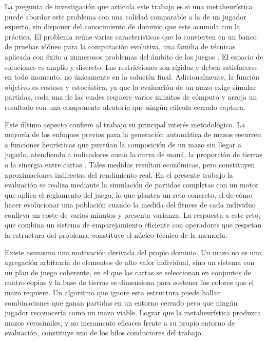La pregunta de investigación que articula este trabajo es si una metaheurística puede abordar este problema con una calidad comparable a la de un jugador experto, sin disponer del conocimiento de dominio que este acumula con la práctica. El problema reúne varias características que lo convierten en un banco de pruebas idóneo para la computación evolutiva, una familia de técnicas aplicada con éxito a numerosos problemas del ámbito de los juegos \cite{yannakakis2018, risi2017}. El espacio de soluciones es amplio y discreto. Las restricciones son rígidas y deben satisfacerse en todo momento, no únicamente en la solución final. Adicionalmente, la función objetivo es costosa y estocástica, ya que la evaluación de un mazo exige simular partidas, cada una de las cuales requiere varios minutos de cómputo y arroja un resultado con una componente aleatoria que ningún cálculo cerrado captura.

Este último aspecto confiere al trabajo su principal interés metodológico. La mayoría de los enfoques previos para la generación automática de mazos recurren a funciones heurísticas que puntúan la composición de un mazo sin llegar a jugarlo, atendiendo a indicadores como la curva de maná, la proporción de tierras o la sinergia entre cartas \cite{garciasanchez2018, miernik2022, stiegler2016}. Tales medidas resultan económicas, pero constituyen aproximaciones indirectas del rendimiento real. En el presente trabajo la evaluación se realiza mediante la simulación de partidas completas con un motor que aplica el reglamento del juego, lo que plantea un reto concreto, el de cómo hacer evolucionar una población cuando la medida del fitness de cada individuo conlleva un coste de varios minutos y presenta varianza. La respuesta a este reto, que combina un sistema de emparejamiento eficiente con operadores que respetan la estructura del problema, constituye el núcleo técnico de la memoria.

Existe asimismo una motivación derivada del propio dominio. Un mazo no es una agregación arbitraria de elementos de alto valor individual, sino un sistema con un plan de juego coherente, en el que las cartas se seleccionan en conjuntos de cuatro copias y la base de tierras se dimensiona para sostener los colores que el mazo requiere. Un algoritmo que ignore esta estructura puede hallar combinaciones que ganan partidas en un entorno cerrado pero que ningún jugador reconocería como un mazo viable. Lograr que la metaheurística produzca mazos verosímiles, y no meramente eficaces frente a su propio entorno de evaluación, constituye uno de los hilos conductores del trabajo.

